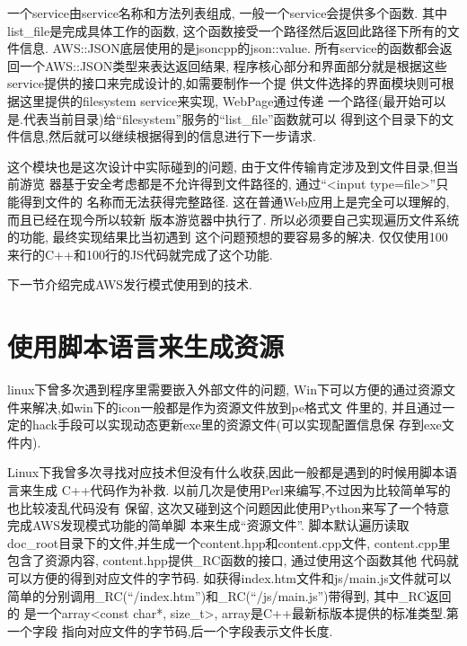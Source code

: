 一个service由service名称和方法列表组成, 一般一个service会提供多个函数. 
其中list\_file是完成具体工作的函数, 这个函数接受一个路径然后返回此路径下所有的文
件信息. AWS::JSON底层使用的是jsoncpp的json::value. 
所有service的函数都会返回一个AWS::JSON类型来表达返回结果, 
程序核心部分和界面部分就是根据这些service提供的接口来完成设计的,如需要制作一个提
供文件选择的界面模块则可根据这里提供的filesystem service来实现, WebPage通过传递
一个路径(最开始可以是.代表当前目录)给``filesystem''服务的``list\_file''函数就可以
得到这个目录下的文件信息,然后就可以继续根据得到的信息进行下一步请求.

这个模块也是这次设计中实际碰到的问题, 由于文件传输肯定涉及到文件目录,但当前游览
器基于安全考虑都是不允许得到文件路径的, 通过``<input type=file>''只能得到文件的
名称而无法获得完整路径. 这在普通Web应用上是完全可以理解的,而且已经在现今所以较新
版本游览器中执行了. 所以必须要自己实现遍历文件系统的功能, 最终实现结果比当初遇到
这个问题预想的要容易多的解决. 仅仅使用100来行的C++和100行的JS代码就完成了这个功能.

下一节介绍完成AWS发行模式使用到的技术.

\section{使用脚本语言来生成资源}
linux下曾多次遇到程序里需要嵌入外部文件的问题,
Win下可以方便的通过资源文件来解决,如win下的icon一般都是作为资源文件放到pe格式文
件里的, 并且通过一定的hack手段可以实现动态更新exe里的资源文件(可以实现配置信息保
存到exe文件内).

Linux下我曾多次寻找对应技术但没有什么收获,因此一般都是遇到的时候用脚本语言来生成
C++代码作为补救. 以前几次是使用Perl来编写,不过因为比较简单写的也比较凌乱代码没有
保留, 这次又碰到这个问题因此使用Python来写了一个特意完成AWS发现模式功能的简单脚
本来生成``资源文件''.
脚本默认遍历读取doc\_root目录下的文件,并生成一个content.hpp和content.cpp文件, 
content.cpp里包含了资源内容, content.hpp提供\_RC函数的接口, 通过使用这个函数其他
代码就可以方便的得到对应文件的字节码. 如获得index.htm文件和js/main.js文件就可以
简单的分别调用\_RC(``/index.htm'')和\_RC(``/js/main.js'')带得到, 其中\_RC返回的
是一个array<const char*, size\_t>, array是C++最新标版本提供的标准类型.第一个字段
指向对应文件的字节码,后一个字段表示文件长度.

